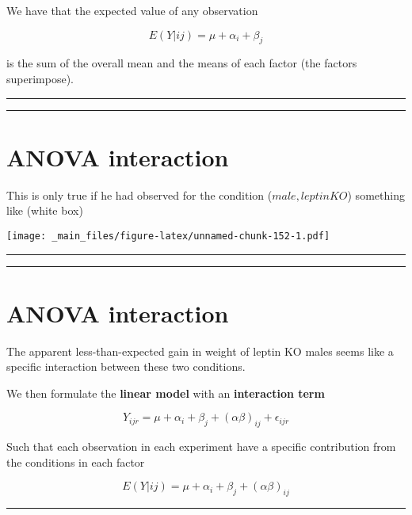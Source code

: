 \documentclass[
]{book}
\begin{document}
We have that the expected value of any observation

\[E(Y|ij)=\mu + \alpha_i+ \beta_j\]

is the sum of the overall mean and the means of each factor (the factors superimpose).

\begin{center}\rule{0.5\linewidth}{0.5pt}\end{center}

\begin{center}\rule{0.5\linewidth}{0.5pt}\end{center}

\hypertarget{anova-interaction-1}{%
\section{ANOVA interaction}\label{anova-interaction-1}}

This is only true if he had observed for the condition (\(male, leptinKO\)) something like (white box)

\texttt{[image: \_main\_files/figure-latex/unnamed-chunk-152-1.pdf]}

\begin{center}\rule{0.5\linewidth}{0.5pt}\end{center}

\begin{center}\rule{0.5\linewidth}{0.5pt}\end{center}

\hypertarget{anova-interaction-2}{%
\section{ANOVA interaction}\label{anova-interaction-2}}

The apparent less-than-expected gain in weight of leptin KO males seems like a specific interaction between these two conditions.

We then formulate the \textbf{linear model} with an \textbf{interaction term}

\[Y_{ijr} = \mu + \alpha_i + \beta_j + (\alpha\beta)_{ij} + \epsilon_{ijr}\]

Such that each observation in each experiment have a specific contribution from the conditions in each factor

\[E(Y|ij)=\mu + \alpha_i+ \beta_j + (\alpha\beta)_{ij}\]

\begin{center}\rule{0.5\linewidth}{0.5pt}\end{center}
\end{document}

